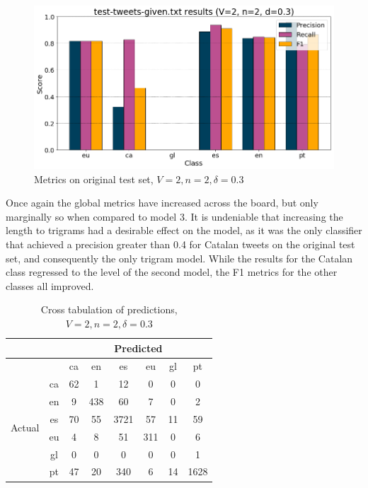 \documentclass[runningheads]{llncs}
\begin{document}
\begin{figure}
    \begin{center}
        \includegraphics[width=12.5cm]{images/test_tweets_given_results_2_2_0.3.png}
        \caption{Metrics on original test set, $V=2, n=2, \delta=0.3$}
        \label{fig:pre_demo_2_2_0.3}
    \end{center}
\end{figure}

Once again the global metrics have increased across the board, but only marginally so when compared to model 3. It is undeniable that increasing the length to trigrams had a desirable effect on the model, as it was the only classifier that achieved a precision greater than 0.4 for Catalan tweets on the original test set, and consequently the only trigram model. While the results for the Catalan class regressed to the level of the second model, the F1 metrics for the other classes all improved.

\begin{table}
	\centering
	\caption{Cross tabulation of predictions, $V=2, n=2, \delta=0.3$}
	\label{tab:pre_demo_confusion_2_2_0.3}
	\begin{tabular}{|c|c|c|c|c|c|c|c|} \hline
		& & \multicolumn{6}{c|}{Predicted} \\ \hline
		& &  ca &   en &    es &   eu &  gl &    pt \\ \hline
		\multirow{6}{*}{Actual} & ca   &  62 &    1 &    12 &    0 &   0 &     0 \\
		& en   &   9 &  438 &    60 &    7 &   0 &     2 \\
		& es   &  70 &   55 &  3721 &   57 &  11 &    59 \\
		& eu   &   4 &    8 &    51 &  311 &   0 &     6 \\
		& gl   &   0 &    0 &     0 &    0 &   0 &     1 \\
		& pt   &  47 &   20 &   340 &    6 &  14 &  1628 \\ \hline
	\end{tabular}
\end{table}
\end{document}
